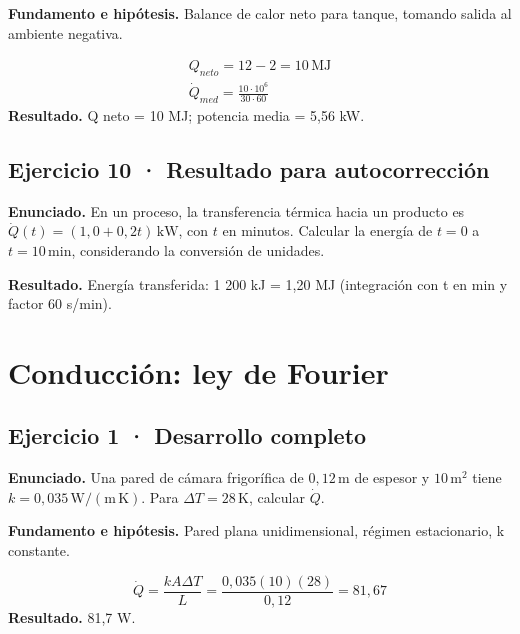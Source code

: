 \documentclass[11pt,a4paper]{article}
\begin{document}
\textbf{Fundamento e hipótesis.} Balance de calor neto para tanque, tomando salida al ambiente negativa.

\[
\begin{gathered}
Q_{neto}=12-2=10\,\mathrm{MJ}\\\dot Q_{med}=\frac{10\cdot10^6}{30\cdot60}
\end{gathered}
\]
\textbf{Resultado.} Q neto = 10 MJ; potencia media = 5,56 kW.


\subsection*{Ejercicio 10 · Resultado para autocorrección}
\textbf{Enunciado.} En un proceso, la transferencia térmica hacia un producto es \(\dot Q(t)=(1{,}0+0{,}2t)\,\mathrm{kW}\), con \(t\) en minutos. Calcular la energía de \(t=0\) a \(t=10\,\mathrm{min}\), considerando la conversión de unidades.

\textbf{Resultado.} Energía transferida: 1 200 kJ = 1,20 MJ (integración con t en min y factor 60 s/min).


\clearpage

\section{Conducción: ley de Fourier}

\begin{center}\end{center}

\subsection*{Ejercicio 1 · Desarrollo completo}
\textbf{Enunciado.} Una pared de cámara frigorífica de \(0{,}12\,\mathrm m\) de espesor y \(10\,\mathrm m^2\) tiene \(k=0{,}035\,\mathrm{W/(m\,K)}\). Para \(\Delta T=28\,\mathrm K\), calcular \(\dot Q\).

\textbf{Fundamento e hipótesis.} Pared plana unidimensional, régimen estacionario, k constante.

\[
\dot Q=\frac{kA\Delta T}{L}=\frac{0{,}035(10)(28)}{0{,}12}=81{,}67
\]
\textbf{Resultado.} 81,7 W.
\end{document}
